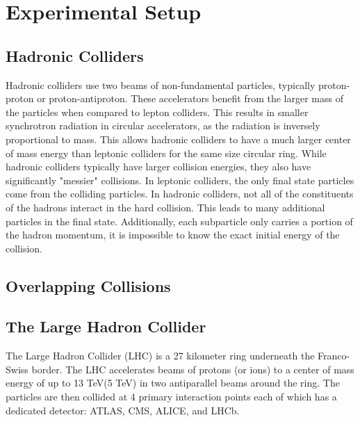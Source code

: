 \chapter{Experimental Setup}
\section{Hadronic Colliders}
Hadronic colliders use two beams of non-fundamental particles, typically proton-proton or proton-antiproton. These accelerators benefit from the larger mass of the particles when compared to lepton colliders. This results in smaller synchrotron radiation in circular accelerators, as the radiation is inversely proportional to mass. This allows hadronic colliders to have a much larger center of mass energy than leptonic colliders for the same size circular ring. \newline
\indent While hadronic colliders typically have larger collision energies, they also have significantly "messier" collisions. In leptonic colliders, the only final state particles come from the colliding particles. In hadronic colliders, not all of the constituents of the hadrons interact in the hard collision. This leads to many additional particles in the final state. Additionally, each subparticle only carries a portion of the hadron momentum, it is impossible to know the exact initial energy of the collision. 
\section{Overlapping Collisions}
\section{The Large Hadron Collider}
The Large Hadron Collider (LHC) is a 27 kilometer ring underneath the Franco-Swiss border. The LHC accelerates beams of protons (or ions) to a center of mass energy of up to 13 TeV(5 TeV) in two antiparallel beams around the ring. The particles are then collided at 4 primary interaction points each of which has a dedicated detector: ATLAS, CMS, ALICE, and LHCb.
